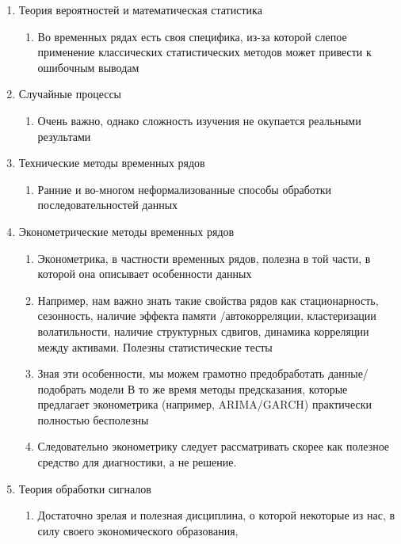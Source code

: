 \begin{enumerate}
  \item Теория вероятностей и математическая статистика
    \begin{enumerate}
      \item Во временных рядах есть своя специфика, из-за которой
        слепое применение классических статистических методов может
        привести к ошибочным выводам
    \end{enumerate}
  \item Случайные процессы
    \begin{enumerate}
      \item Очень важно, однако сложность изучения не окупается
        реальными результами
    \end{enumerate}
  \item Технические методы временных рядов
    \begin{enumerate}
      \item Ранние и во-многом неформализованные способы обработки
        последовательностей данных
    \end{enumerate}
  \item Эконометрические методы временных рядов
    \begin{enumerate}
      \item Эконометрика, в частности временных рядов, полезна в той части, в
        которой она описывает особенности данных
      \item Например, нам важно знать такие свойства рядов как стационарность,
        сезонность, наличие эффекта памяти /автокорреляции, кластеризации
        волатильности, наличие структурных сдвигов, динамика корреляции между
        активами. Полезны статистические тесты
      \item Зная эти особенности, мы можем грамотно предобработать
        данные/подобрать модели
        В то же время методы предсказания, которые предлагает эконометрика
        (например, ARIMA/GARCH) практически полностью бесполезны
      \item Следовательно эконометрику следует рассматривать скорее
        как полезное средство для диагностики, а не решение.
    \end{enumerate}
  \item Теория обработки сигналов
    \begin{enumerate}
      \item Достаточно зрелая и полезная дисциплина, о которой
        некоторые из нас, в силу своего экономического образования,

\end{enumerate}
\end{enumerate}
